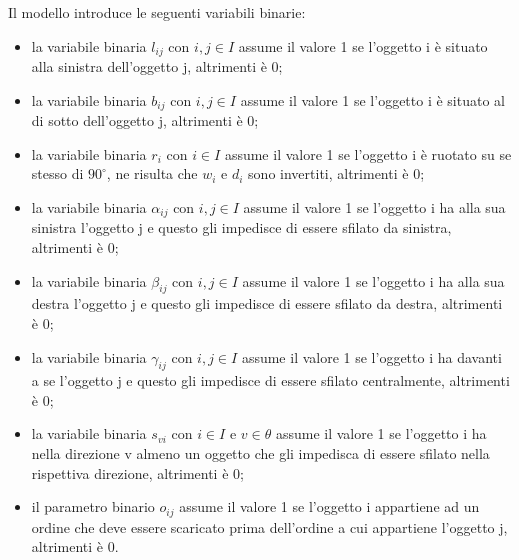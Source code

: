 Il modello introduce le seguenti variabili binarie:
\begin{itemize}
	\item la variabile binaria $l_{ij}$ con $i,j \in I$ assume il valore 1 se l'oggetto i è situato alla sinistra dell'oggetto j, altrimenti è 0;
	\item la variabile binaria $b_{ij}$ con $i,j \in I$ assume il valore 1 se l'oggetto i è situato al di sotto dell'oggetto j, altrimenti è 0;
	\item la variabile binaria $r_{i}$ con $i \in I$ assume il valore 1 se l'oggetto i è ruotato su se stesso di $90^{\circ}$, ne risulta che $w_{i}$ e $d_{i}$ sono invertiti, altrimenti è 0;
	\item la variabile binaria $\alpha_{ij}$ con $i,j \in I$ assume il valore 1 se l'oggetto i ha alla sua sinistra l'oggetto j e questo gli impedisce di essere sfilato da sinistra, altrimenti è 0;
	\item la variabile binaria $\beta_{ij}$ con $i,j \in I$ assume il valore 1 se l'oggetto i ha alla sua destra l'oggetto j e questo gli impedisce di essere sfilato da destra, altrimenti è 0;
	\item la variabile binaria $\gamma_{ij}$ con $i,j \in I$ assume il valore 1 se l'oggetto i ha davanti a se l'oggetto j e questo gli impedisce di essere sfilato centralmente, altrimenti è 0;
	\item la variabile binaria $s_{vi}$ con $i \in I$ e $v \in \theta$ assume il valore 1 se l'oggetto i ha nella direzione v almeno un oggetto che gli impedisca di essere sfilato nella rispettiva direzione, altrimenti è 0;
	\item il parametro binario $o_{ij}$ assume il valore 1 se l'oggetto i appartiene ad un ordine che deve essere scaricato prima dell'ordine a cui appartiene l'oggetto j, altrimenti è 0.
\end{itemize}

